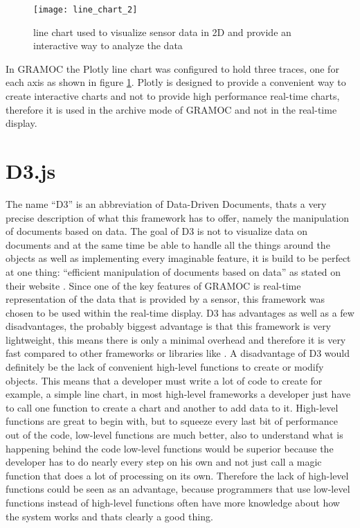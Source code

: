 \begin{figure}[H]
    \centering
    \texttt{[image: line\_chart\_2]}
    \caption{line chart used to visualize sensor data in 2D and provide an interactive way to analyze the data}
    \label{fig:plotlylinechart}
\end{figure}

In GRAMOC the Plotly line chart was configured to hold three traces, one for each axis as shown in figure \ref{fig:plotlylinechart}. Plotly is designed to provide a convenient way to create interactive charts and not to provide high performance real-time charts, therefore it is used in the archive mode of GRAMOC and not in the real-time display.

\section{D3.js}
The name ``D3'' is an abbreviation of Data-Driven Documents, thats a very precise description of what this framework has to offer, namely the manipulation of documents based on data. The goal of D3 is not to visualize data on documents and at the same time be able to handle all the things around the objects as well as implementing every imaginable feature, it is build to be perfect at one thing: ``efficient manipulation of documents based on data'' as stated on their website \cite{d3}. Since one of the key features of GRAMOC is real-time representation of the data that is provided by a sensor, this framework was chosen to be used within the real-time display. D3 has advantages as well as a few disadvantages, the probably biggest advantage is that this framework is very lightweight, this means there is only a minimal overhead and therefore it is very fast compared to other frameworks or libraries like . A disadvantage of D3 would definitely be the lack of convenient high-level functions to create or modify objects. This means that a developer must write a lot of code to create for example, a simple line chart, in most high-level frameworks a developer just have to call one function to create a chart and another to add data to it. High-level functions are great to begin with, but to squeeze every last bit of performance out of the code, low-level functions are much better, also to understand what is happening behind the code low-level functions would be superior because the developer has to do nearly every step on his own and not just call a magic function that does a lot of processing on its own. Therefore the lack of high-level functions could be seen as an advantage, because programmers that use low-level functions instead of high-level functions often have more knowledge about how the system works and thats clearly a good thing.


